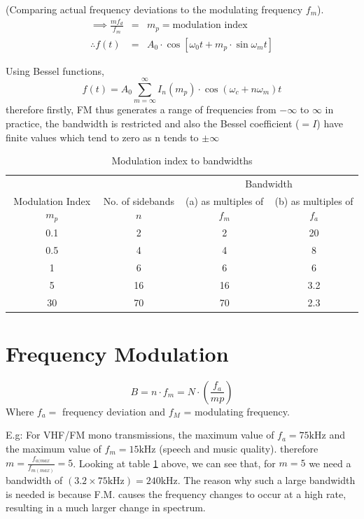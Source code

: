 \documentclass[11pt]{article} %
\begin{document}
		(Comparing actual frequency deviations to the modulating frequency $f_m$).
		\begin{eqnarray}
			\implies \frac{mf_d}{f_m} &=& m_p = \mbox{modulation index} \nonumber \\
			\therefore f(t) &=& A_0 \cdot\cos{\left[\omega_0t+m_p\cdot\sin{\omega_mt}\right]}
		\end{eqnarray}

		Using Bessel functions, 
		\begin{equation}
			f(t) = A_0 \sum_{m=\infty}^{\infty}{I_n(m_p)\cdot \cos{(\omega_c + n\omega_m)}t}
		\end{equation}
		therefore firstly, FM thus generates a range of frequencies from $-\infty$ to $\infty$ in practice, the bandwidth is restricted and also the Bessel coefficient ($=I$) have finite values which tend to zero as n tends to $\pm \infty$

		\begin{table}[h]
		    \begin{tabular}{cccc}
		        \hline
		 & & \multicolumn{2}{c}{Bandwidth}  \\
		Modulation Index $m_p$ & No. of sidebands $n$ &  (a) as multiples of $f_m$ & (b) as multiples of $f_a$ \\ \hline
			0.1 &  2 & 2 & 20 \\
			0.5 & 4 & 4 & 8 \\
			1 & 6 & 6 & 6 \\
			5 & 16 & 16 & 3.2 \\
			30 & 70 & 70 &2.3 \\
		    \end{tabular}
			\caption{Modulation index to bandwidths}
			\label{tab:modind}
		\end{table}

\section{Frequency Modulation}
	\begin{equation}
		B = n\cdot f_m = N\cdot\left(\frac{f_a}{mp}\right)
	\end{equation}
	Where $f_a=$ frequency deviation and $f_M$ = modulating frequency.

	E.g: For VHF/FM mono transmissions, the maximum value of $f_a=75\mbox{kHz}$ and the maximum value of $f_m=15\mbox{kHz}$ (speech and music quality).
	therefore $m = \frac{f_{a(max}}{f_{m(max)}} = 5$. 
	Looking at table \ref{tab:modind} above, we can see that, for $m=5$ we need a bandwidth of $(3.2\times 75\mbox{kHz})=240\mbox{kHz}$. 
	The reason why such a large bandwidth is needed is because F.M. causes the frequency changes to occur at a high rate, resulting in a much larger change in spectrum.
\end{document}
